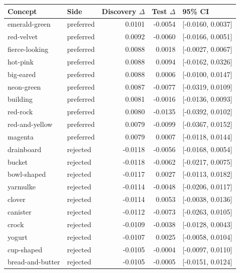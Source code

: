 \begin{tabular}{llrrl}
\toprule
Concept & Side & Discovery $\Delta$ & Test $\Delta$ & 95\% CI \\
\midrule
emerald-green & preferred & 0.0101 & -0.0054 & [-0.0160, 0.0037] \\
red-velvet & preferred & 0.0092 & -0.0060 & [-0.0166, 0.0051] \\
fierce-looking & preferred & 0.0088 & 0.0018 & [-0.0027, 0.0067] \\
hot-pink & preferred & 0.0088 & 0.0094 & [-0.0162, 0.0326] \\
big-eared & preferred & 0.0088 & 0.0006 & [-0.0100, 0.0147] \\
neon-green & preferred & 0.0087 & -0.0077 & [-0.0319, 0.0109] \\
building & preferred & 0.0081 & -0.0016 & [-0.0136, 0.0093] \\
red-rock & preferred & 0.0080 & -0.0135 & [-0.0392, 0.0102] \\
red-and-yellow & preferred & 0.0079 & -0.0099 & [-0.0367, 0.0152] \\
magenta & preferred & 0.0079 & 0.0007 & [-0.0118, 0.0144] \\
drainboard & rejected & -0.0118 & -0.0056 & [-0.0168, 0.0054] \\
bucket & rejected & -0.0118 & -0.0062 & [-0.0217, 0.0075] \\
bowl-shaped & rejected & -0.0117 & 0.0027 & [-0.0113, 0.0182] \\
yarmulke & rejected & -0.0114 & -0.0048 & [-0.0206, 0.0117] \\
clover & rejected & -0.0114 & 0.0053 & [-0.0038, 0.0136] \\
canister & rejected & -0.0112 & -0.0073 & [-0.0263, 0.0105] \\
crock & rejected & -0.0109 & -0.0038 & [-0.0128, 0.0043] \\
yogurt & rejected & -0.0107 & 0.0025 & [-0.0058, 0.0104] \\
cup-shaped & rejected & -0.0105 & -0.0004 & [-0.0097, 0.0110] \\
bread-and-butter & rejected & -0.0105 & -0.0005 & [-0.0151, 0.0124] \\
\bottomrule
\end{tabular}
